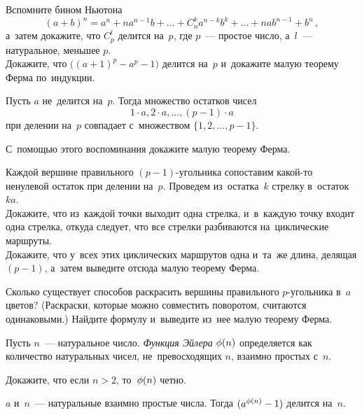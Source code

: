 \begin{problems}

\item
\subproblem
Вспомните бином Ньютона
\[
    (a + b)^n
=
    a^n + n a^{n-1} b +
    \ldots +
    C_{n}^{k} a^{n-k} b^k +
    \ldots +
    n a b^{n-1} + b^n
\, , \] а~затем докажите, что $C_{p}^{l}$ делится на~$p$, где $p$~--- простое
число, а~$l$~--- натуральное, меньшее $p$.
\\
\subproblem
Докажите, что $\bigl( (a + 1)^p - a^p - 1 \bigr)$ делится на~$p$ и~докажите
малую теорему Ферма по~индукции.

\item
\label{algebra/number-theory/fermats-theorem-g8r1:problem:fermat-proof-1}%
Пусть $a$ не~делится на~$p$.
Тогда множество остатков чисел
\[
    1 \cdot a, 2 \cdot a, \ldots, (p - 1) \cdot a
\]
при делении на~$p$ совпадает с~множеством $\{ 1, 2, \ldots, p - 1 \}$.
\par
С~помощью этого воспоминания докажите малую теорему Ферма.

\item
\label{algebra/number-theory/fermats-theorem-g8r1:problem:fermat-proof-2}%
Каждой вершине правильного $(p - 1)$-угольника сопоставим какой-то ненулевой
остаток при делении на~$p$.
Проведем из~остатка~$k$ стрелку в~остаток~$k a$.
\\
\subproblem
Докажите, что из~каждой точки выходит одна стрелка, и~в~каждую точку входит
одна стрелка, откуда следует, что все стрелки разбиваются на~циклические
маршруты.
\\
\subproblem
Докажите, что у~всех этих циклических маршрутов одна и~та~же длина, делящая
$(p - 1)$, а~затем выведите отсюда малую теорему Ферма.

\item
Сколько существует способов раскрасить вершины правильного $p$-угольника
в~$a$ цветов?
(Раскраски, которые можно совместить поворотом, считаются одинаковыми.)
Найдите формулу и~выведите из~нее малую теорему Ферма.

\end{problems}

Пусть $n$~--- натуральное число.
\emph{Функция Эйлера} $\mathrm{\phi}(n)$ определяется как количество натуральных
чисел, не~превосходящих $n$, взаимно простых с~$n$.

Докажите, что если $n > 2$, то~$\mathrm{\phi}(n)$ четно.

$a$ и~$n$~--- натуральные взаимно простые числа.
Тогда $(a^{\mathrm{\phi}(n)} - 1)$ делится на~$n$.

